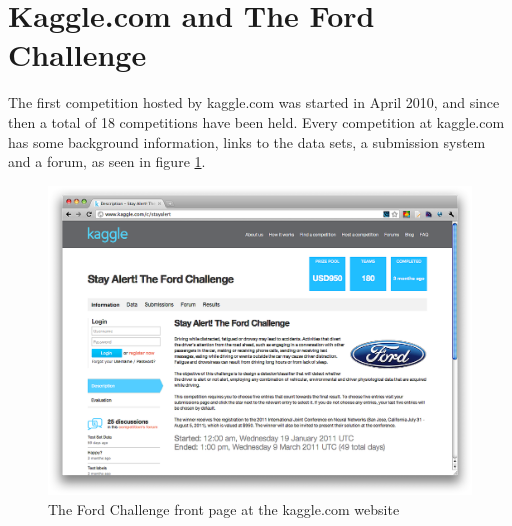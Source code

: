 \section{Kaggle.com and The Ford Challenge}
The first competition hosted by kaggle.com was started in April 2010, and since then a total of 18 competitions have been held. Every competition at kaggle.com has some background information, links to the data sets, a submission system and a forum, as seen in figure \ref{fig:fordchallenge_frontpage}. \par

\begin{figure}[tbhHp]
    \centering
        \includegraphics[width=.9\textwidth]{media/fordchallenge_frontpage.png}
    \caption{The Ford Challenge front page at the kaggle.com website}
    \label{fig:fordchallenge_frontpage}
\end{figure}

